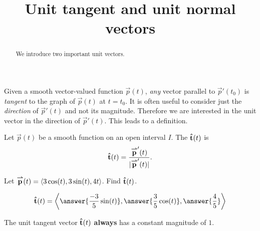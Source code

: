 \documentclass{ximera}
\title[Dig-In:]{Unit tangent and unit normal vectors}
\begin{document}
\begin{abstract}
  We introduce two important unit vectors. 
\end{abstract}
\maketitle


Given a smooth vector-valued function $\vec{p}(t)$, \textit{any}
vector parallel to $\vec{p}'(t_0)$ is \textit{tangent} to the graph of
$\vec{p}(t)$ at $t=t_0$. It is often useful to consider just the
\textit{direction} of $\vec{p}'(t)$ and not its magnitude. Therefore we are
interested in the unit vector in the direction of $\vec{p}'(t)$. This
leads to a definition.
\begin{definition}
Let $\vec{p}(t)$ be a smooth function on an open interval $I$. The
 $\mathbf{\hat{t}}(t)$ is  
\[
\mathbf{\hat{t}}(t) = \frac{{\overset{\boldsymbol{\rightharpoonup}}{\mathbf{p}}}'(t)}{|{\overset{\boldsymbol{\rightharpoonup}}{\mathbf{p}}}'(t)|}.
\]
\end{definition}

\begin{question}
  Let ${\overset{\boldsymbol{\rightharpoonup}}{\mathbf{p}}}(t) = \left\langle 3\cos(t), 3\sin(t), 4t\right\rangle$. Find $\mathbf{\hat{t}}(t)$.
  \begin{prompt}
    \[
    \utan(t) = \vector{\answer{\frac{-3}{5}\sin(t)},\answer{\frac{3}{5}\cos(t)},\answer{\frac{4}{5}}}
    \]
    \begin{feedback}
      The unit tangent vector $\mathbf{\hat{t}}(t)$ \textbf{always} has a constant
      magnitude of $1$.
    \end{feedback}
  \end{prompt}
\end{question}
\end{document}
